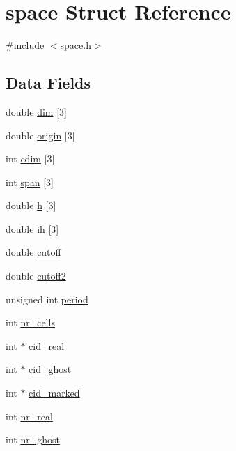 \hypertarget{structspace}{\section{space Struct Reference}
\label{structspace}
}


{\ttfamily \#include $<$space.\-h$>$}

\subsection*{Data Fields}
\begin{DoxyCompactItemize}
\item 
double \hyperlink{structspace_ac45d92a78e958d1bdbce22331b752147}{dim} \mbox{[}3\mbox{]}
\item 
double \hyperlink{structspace_a61c2e65573374fec6a4c402febbade84}{origin} \mbox{[}3\mbox{]}
\item 
int \hyperlink{structspace_abc41c92f496aa850c7dfa0359158d69a}{cdim} \mbox{[}3\mbox{]}
\item 
int \hyperlink{structspace_adf1e7911214d724d3d08b3c46e6a6a7a}{span} \mbox{[}3\mbox{]}
\item 
double \hyperlink{structspace_a98c9ffdf27710977bcfc00488fa9727c}{h} \mbox{[}3\mbox{]}
\item 
double \hyperlink{structspace_ac7c56c7d8f3b0a41e13e2656e22afe37}{ih} \mbox{[}3\mbox{]}
\item 
double \hyperlink{structspace_a034fbedcce0aee66ee125138543e2703}{cutoff}
\item 
double \hyperlink{structspace_ae52bffc8951344766241cba3826c70ad}{cutoff2}
\item 
unsigned int \hyperlink{structspace_a528ce5558d238708bc2cb7e5a71ad961}{period}
\item 
int \hyperlink{structspace_aa6e3b6f5feb3d1004ca3803fb6bfa6dd}{nr\-\_\-cells}
\item 
int $\ast$ \hyperlink{structspace_a4cc50029da279d1cef5439fbf0bdc354}{cid\-\_\-real}
\item 
int $\ast$ \hyperlink{structspace_a27fdd82c93e1319f1270cd6a84d2c245}{cid\-\_\-ghost}
\item 
int $\ast$ \hyperlink{structspace_afb53b22e386b55484f3e4bdab0b52b48}{cid\-\_\-marked}
\item 
int \hyperlink{structspace_a8b23aef7c564942ddcb33255a09a6cf9}{nr\-\_\-real}
\item 
int \hyperlink{structspace_a2ba1ca0768f11c20f4581eff56bc3f95}{nr\-\_\-ghost}
\item 

\end{DoxyCompactItemize}

